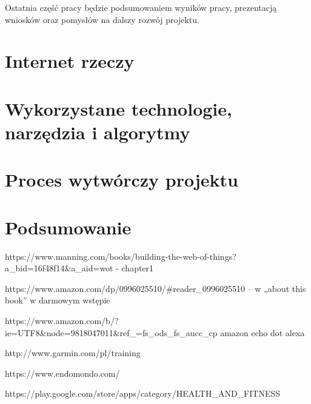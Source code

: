 \documentclass[a4paper,twoside,titlepage,openright]{book}
\begin{document}
Ostatnia część pracy będzie podsumowaniem wyników pracy, prezentacją wniosków oraz pomysłów na dalszy rozwój projektu.



\clearpage{\pagestyle{empty}\cleardoublepage}
\chapter{Internet rzeczy}


\chapter{Wykorzystane technologie, narzędzia i algorytmy}


\chapter{Proces wytwórczy projektu}

 
\chapter*{Podsumowanie}
 
 
 
 
\listoffigures


\begin{thebibliography}{99}



 https://www.manning.com/books/building-the-web-of-things?a\_bid=16f48f14\&a\_aid=wot - chapter1

 https://www.amazon.com/dp/0996025510/\#reader\_0996025510 – w „about this book” w darmowym wstępie

 https://www.amazon.com/b/?ie=UTF8\&node=9818047011\&ref\_=fs\_ods\_fs\_aucc\_cp amazon echo dot alexa

 http://www.garmin.com/pl/training 

 https://www.endomondo.com/ 

 https://play.google.com/store/apps/category/HEALTH\_AND\_FITNESS 


\end{thebibliography}
\end{document}
